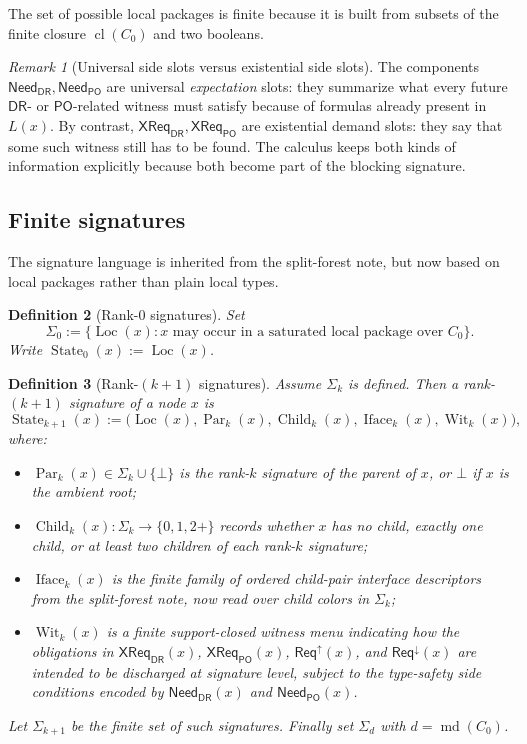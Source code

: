 \documentclass[11pt]{article}
\newtheorem{definition}{Definition}[section]
\theoremstyle{remark}
\newtheorem{remark}[definition]{Remark}
\newcommand{\DR}{\mathsf{DR}}
\newcommand{\PO}{\mathsf{PO}}
\newcommand{\cl}{\operatorname{cl}}
\newcommand{\md}{\operatorname{md}}
\newcommand{\State}{\operatorname{State}}
\newcommand{\Par}{\operatorname{Par}}
\newcommand{\Child}{\operatorname{Child}}
\newcommand{\Iface}{\operatorname{Iface}}
\newcommand{\Wit}{\operatorname{Wit}}
\newcommand{\Loc}{\operatorname{Loc}}
\newcommand{\ReqUp}{\mathsf{Req}^{\uparrow}}
\newcommand{\ReqDown}{\mathsf{Req}^{\downarrow}}
\newcommand{\CrossDR}{\mathsf{XReq}_{\DR}}
\newcommand{\CrossPO}{\mathsf{XReq}_{\PO}}
\newcommand{\NeedDR}{\mathsf{Need}_{\DR}}
\newcommand{\NeedPO}{\mathsf{Need}_{\PO}}
\begin{document}
The set of possible local packages is finite because it is built from subsets of the finite closure $\cl(C_0)$ and two booleans.

\begin{remark}[Universal side slots versus existential side slots]
The components $\NeedDR,\NeedPO$ are universal \emph{expectation} slots: they summarize what every future $\DR$- or $\PO$-related witness must satisfy because of formulas already present in $L(x)$. By contrast, $\CrossDR,\CrossPO$ are existential demand slots: they say that some such witness still has to be found. The calculus keeps both kinds of information explicitly because both become part of the blocking signature.
\end{remark}

\subsection{Finite signatures}

The signature language is inherited from the split-forest note, but now based on local packages rather than plain local types.

\begin{definition}[Rank-$0$ signatures]
Set
\[
\Sigma_0:=\{\Loc(x): x\text{ may occur in a saturated local package over }C_0\}.
\]
Write $\State_0(x):=\Loc(x)$.
\end{definition}

\begin{definition}[Rank-$(k+1)$ signatures]
Assume $\Sigma_k$ is defined. Then a rank-$(k+1)$ signature of a node $x$ is
\[
\State_{k+1}(x):=\bigl(\Loc(x),\Par_k(x),\Child_k(x),\Iface_k(x),\Wit_k(x)\bigr),
\]
where:
\begin{itemize}
    \item $\Par_k(x)\in \Sigma_k\cup\{\bot\}$ is the rank-$k$ signature of the parent of $x$, or $\bot$ if $x$ is the ambient root;
    \item $\Child_k(x):\Sigma_k\to\{0,1,2+\}$ records whether $x$ has no child, exactly one child, or at least two children of each rank-$k$ signature;
    \item $\Iface_k(x)$ is the finite family of ordered child-pair interface descriptors from the split-forest note, now read over child colors in $\Sigma_k$;
    \item $\Wit_k(x)$ is a finite support-closed witness menu indicating how the obligations in $\CrossDR(x)$, $\CrossPO(x)$, $\ReqUp(x)$, and $\ReqDown(x)$ are intended to be discharged at signature level, subject to the type-safety side conditions encoded by $\NeedDR(x)$ and $\NeedPO(x)$.
\end{itemize}
Let $\Sigma_{k+1}$ be the finite set of such signatures. Finally set $\Sigma_d$ with $d=\md(C_0)$.
\end{definition}
\end{document}
